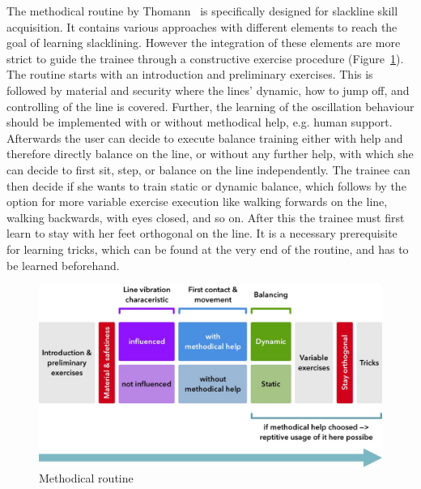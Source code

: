 The methodical routine by Thomann~\cite{Thomann2013-aa} is specifically designed for slackline skill acquisition. It contains various approaches with different elements to reach the goal of learning slacklining. However the integration of these elements are more strict to guide the trainee through a constructive exercise procedure (Figure~\ref{fig:3_3_1_methodicalRoutine}). The routine starts with an introduction and preliminary exercises. This is followed by material and security where the lines' dynamic, how to jump off, and controlling of the line is covered. Further, the learning of the oscillation behaviour should be implemented with or without methodical help, e.g. human support. Afterwards the user can decide to execute balance training either with help and therefore directly balance on the line, or without any further help, with which she can decide to first sit, step, or balance on the line independently.
The trainee can then decide if she wants to train static or dynamic balance, which follows by the option for more variable exercise execution like walking forwards on the line, walking backwards, with eyes closed, and so on. After this the trainee must first learn to stay with her feet orthogonal on the line. It is a necessary prerequisite for learning tricks, which can be found at the very end of the routine, and has to be learned beforehand.
\begin{figure}[htb]
	\centering
	\begin{minipage}[t]{1\linewidth}
		\centering
		\includegraphics[width=0.91\linewidth]{Pictures/3_3_1_methodicalRoutine3}
		\caption{Methodical routine~\cite{Thomann2013-aa}}
		\label{fig:3_3_1_methodicalRoutine}
	\end{minipage}
\end{figure}

